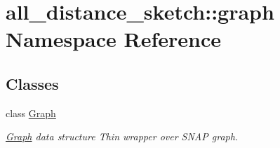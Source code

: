 \hypertarget{namespaceall__distance__sketch_1_1graph}{}\section{all\+\_\+distance\+\_\+sketch\+:\+:graph Namespace Reference}
\label{namespaceall__distance__sketch_1_1graph}
\subsection*{Classes}
\begin{DoxyCompactItemize}
\item 
class \hyperlink{classall__distance__sketch_1_1graph_1_1Graph}{Graph}
\begin{DoxyCompactList}\small\item\em \hyperlink{classall__distance__sketch_1_1graph_1_1Graph}{Graph} data structure Thin wrapper over S\+N\+A\+P graph. \end{DoxyCompactList}\end{DoxyCompactItemize}
